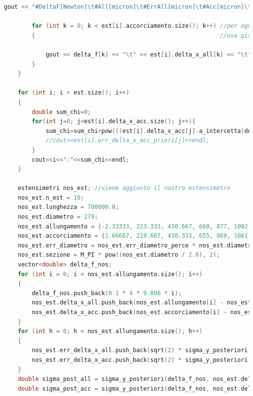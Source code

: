 \documentclass[a4paper,11pt,oneside]{article}
\begin{document}
\begin{lstlisting}[language=C++, label=lst:seconda_parte, caption=seconda\_parte]
		gout << "#DeltaF[Newton]\t#All[micron]\t#ErrAll[micron]\t#Acc[micron]\t#ErrAcc[micron]\tsigma_post_ALL\tsigma_post_ACC" << endl;

		for (int k = 0; k < est[i].accorciamento.size(); k++) //per ogni valore di all e acc stampami i dati
		{													  //usa già la sigm a posteriori

			gout << delta_f[k] << "\t" << est[i].delta_x_all[k] << "\t" << est[i].err_delta_x_all[k] << "\t" << est[i].delta_x_acc[k] << "\t" << est[i].err_delta_x_acc[k] << "\t" << sigma_y_posteriori(delta_f, est[i].delta_x_all) << "\t" << sigma_y_posteriori(delta_f, est[i].delta_x_acc) << endl;
		}
	}
	
	for (int i; i < est.size(); i++)
	{
		double sum_chi=0;
		for(int j=0; j<est[i].delta_x_acc.size(); j++){
			sum_chi=sum_chi+pow(((est[i].delta_x_acc[j]-a_intercetta(delta_f, est[i].delta_x_acc)-(b_angolare(delta_f, est[i].delta_x_acc)*delta_f[j]))/est[i].err_delta_x_acc_priori[j]),2);
			//cout<<est[i].err_delta_x_acc_priori[j]<<endl;
		}
		cout<<i<<":"<<sum_chi<<endl;
	}

	estensimetri nos_est; //viene aggiunto il nostro estensimetro
	nos_est.n_est = 10;
	nos_est.lunghezza = 700000.0;
	nos_est.diametro = 279;
	nos_est.allungamento = {-2.33333, 223.333, 430.667, 660, 877, 1092, 1310.33, 1512.33, 1748.67, 1948.33, 2170};
	nos_est.accorciamento = {1.66667, 219.667, 430.333, 655, 869, 1081.67, 1303.67, 1513.67, 1727, 1949.67, 2170};
	nos_est.err_diametro = nos_est.err_diametro_perce * nos_est.diametro;
	nos_est.sezione = M_PI * pow((nos_est.diametro / 2.0), 2);
	vector<double> delta_f_nos;
	for (int i = 0; i < nos_est.allungamento.size(); i++)
	{
		delta_f_nos.push_back(0.1 * 4 * 9.806 * i);
		nos_est.delta_x_all.push_back(nos_est.allungamento[i] - nos_est.allungamento[0]);
		nos_est.delta_x_acc.push_back(nos_est.accorciamento[i] - nos_est.accorciamento[0]);
	}
	for (int h = 0; h < nos_est.allungamento.size(); h++)
	{
		nos_est.err_delta_x_all.push_back(sqrt(2) * sigma_y_posteriori(delta_f_nos, nos_est.delta_x_all)); //vengono dalla sigma post fatta su all e accc
		nos_est.err_delta_x_acc.push_back(sqrt(2) * sigma_y_posteriori(delta_f_nos, nos_est.delta_x_all));
	}
	double sigma_post_all = sigma_y_posteriori(delta_f_nos, nos_est.delta_x_all);
	double sigma_post_acc = sigma_y_posteriori(delta_f_nos, nos_est.delta_x_acc);


\end{lstlisting}
\end{document}
